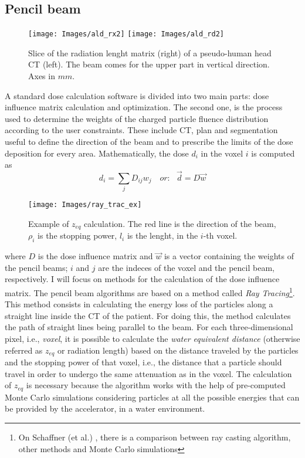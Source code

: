 \documentclass[12pt, a4paper, twoside]{book}
\begin{document}

\subsection{Pencil beam} 
\label{sec:pen}
\begin{figure}[!b]
\centering
\texttt{[image: Images/ald\_rx2]}
\texttt{[image: Images/ald\_rd2]}
\caption{Slice of the radiation lenght matrix (right) of a pseudo-human head CT (left). The beam comes for the upper part in vertical direction. Axes in $mm$. }
\label{fig:rd}
\end{figure}
A standard dose calculation software is divided into two main parts: dose influence matrix calculation and optimization. The second one, is the process used to determine the weights of the charged particle fluence distribution according to the user constraints. These include CT, plan and segmentation useful to define the direction of the beam and to prescribe the limits of the dose deposition for every area.
Mathematically, the dose $d_i$ in the voxel $i$ is computed as
\[
d_i = \sum_j D_{ij}w_j\,\,\,\,\,\,\textit{or:}\,\,\,\,\,\vec{d} = D\vec{w}
\]
\begin{wrapfigure}{r}{.6\textwidth}
\vspace{-5mm}
{\texttt{[image: Images/ray\_trac\_ex]}}
\caption{Example of $z_{eq}$ calculation. The red line is the direction of the beam, $\rho_i$ is the stopping power, $l_i$ is the lenght, in the $i$-th voxel.}
\label{fig:rayt}
\end{wrapfigure}
where $D$ is the dose influence matrix and $\vec{w}$ is a vector containing the weights of the pencil beams; $i$ and $j$ are the indeces of the voxel and the pencil beam, respectively.
I will focus on methods for the calculation of the dose influence matrix.
The pencil beam algorithms are based on a method called \emph{Ray Tracing}\footnote{On Schaffner (et al.) \cite{schaf:pba}, there is a comparison between ray casting algorithm, other methods and Monte Carlo simulations}. This method consists in calculating the energy loss of the particles along a straight line inside the CT of the patient. For doing this, the method calculates the path of straight lines being parallel to the beam. For each three-dimensional pixel, i.e., \emph{voxel}, it is possible to calculate the \emph{water equivalent distance} (otherwise referred as $z_{eq}$ or radiation length) based on the distance traveled by the particles and the stopping power of that voxel, i.e., the distance that a particle should travel in order to undergo the same attenuation as in the voxel. The calculation of $z_{eq}$ is necessary because the algorithm works with the help of pre-computed Monte Carlo simulations considering particles at all the possible energies that can be provided by the accelerator, in a water environment. 
\end{document}
